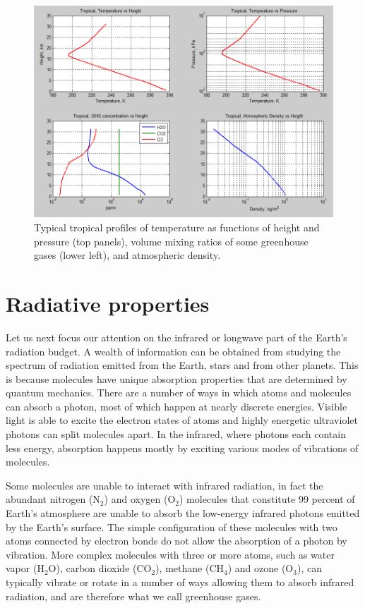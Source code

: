 \documentclass[12pt]{book}
\begin{document}
\begin{figure}
\begin{center}
\includegraphics[width=17 cm]{../external_figures/atmospheric-radiation-13a-tropical-profile-temperature-gases-density}
\end{center}
\caption{ Typical tropical profiles of temperature as functions of height and pressure (top panels), volume mixing ratios of some greenhouse gases (lower left), and atmospheric density.  } 
\label{fig:tropical_profiles}
\end{figure}

\section{Radiative properties}
Let us next focus our attention on the infrared or longwave part of the Earth's radiation budget. A wealth of information can be obtained from studying the spectrum of radiation emitted from the Earth, stars and from other planets. This is because molecules have unique absorption properties that are determined by quantum mechanics. There are a number of ways in which atoms and molecules can absorb a photon, most of which happen at nearly discrete energies. Visible light is able to excite the electron states of atoms and highly energetic ultraviolet photons can split molecules apart. In the infrared, where photons each contain less energy, absorption happens mostly by exciting various modes of vibrations of molecules. 

Some molecules are unable to interact with infrared radiation, in fact the abundant nitrogen (N$_2$) and oxygen (O$_2$) molecules that constitute 99 percent of Earth's atmosphere are unable to absorb the low-energy infrared photons emitted by the Earth's surface. The simple configuration of these molecules with two atoms connected by electron bonds do not allow the absorption of a photon by vibration. More complex molecules with three or more atoms, such as water vapor (H$_2$O), carbon dioxide (CO$_2$), methane (CH$_4$) and ozone (O$_3$), can typically vibrate or rotate in a number of ways allowing them to absorb infrared radiation, and are therefore what we call greenhouse gases. 
\end{document}
